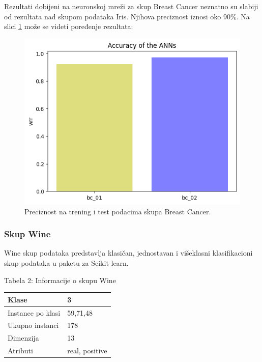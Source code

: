 \documentclass[a4paper]{article}
\begin{document}
{Rezultati dobijeni na neuronskoj mreži za skup Breast Cancer neznatno su slabiji od rezultata nad skupom podataka Iris. Njihova preciznost iznosi oko 90\%. Na slici \ref{fig:breastslika} može se videti poređenje rezultata:

\begin{figure}[h!]
\begin{center}
\includegraphics[scale=0.5]{img/bcwrr.png}
\end{center}
\caption{Preciznost na trening i test podacima skupa Breast Cancer.}
\label{fig:breastslika}
\end{figure}



\subsubsection{Skup Wine}
\label{wine}

Wine skup podataka predstavlja klasičan, jednostavan i višeklasni klasifikacioni skup podataka u paketu za Scikit-learn. 

\begin{center}
Tabela 2: Informacije o skupu Wine\\
\begin{tabular}{|p{4cm}|p{2cm}|}
\hline
Klase             & 3              \\ \hline
Instance po klasi & 59,71,48       \\ \hline
Ukupno instanci   & 178            \\ \hline
Dimenzija         & 13             \\ \hline
Atributi          & real, positive \\ \hline
\end{tabular}\par
\bigskip
\end{center} 

}
\end{document}
